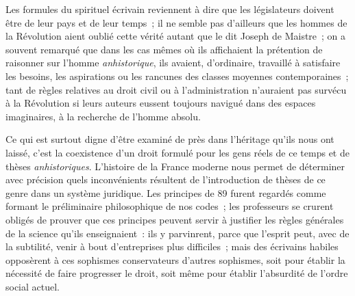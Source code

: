 \documentclass[french,twoside]{book} %
\begin{document}
Les formules du spirituel écrivain reviennent à dire que les législateurs doivent être de leur pays et de leur  temps ; il ne semble pas d’ailleurs que les hommes de la Révolution aient oublié cette vérité autant que le dit Joseph de Maistre ; on a souvent remarqué que dans les cas mêmes où ils affichaient la prétention de raisonner sur l’homme \emph{anhistorique}, ils avaient, d’ordinaire, travaillé à satisfaire les besoins, les aspirations ou les rancunes des classes moyennes contemporaines ; tant de règles relatives au droit civil ou à l’administration n’auraient pas survécu à la Révolution si leurs auteurs eussent toujours navigué dans des espaces imaginaires, à la recherche de l’homme absolu.\par
Ce qui est surtout digne d’être examiné de près dans l’héritage qu’ils nous ont laissé, c’est la coexistence d’un droit formulé pour les gens réels de ce temps et de thèses \emph{anhistoriques}. L’histoire de la France moderne nous permet de déterminer avec précision quels inconvénients résultent de l’introduction de thèses de ce genre dans un système juridique. Les principes de 89 furent regardés comme formant le préliminaire philosophique de nos codes ; les professeurs se crurent obligés de prouver que ces principes peuvent servir à justifier les règles générales de la science qu’ils enseignaient : ils y parvinrent, parce que l’esprit peut, avec de la subtilité, venir à bout d’entreprises plus difficiles ; mais des écrivains habiles opposèrent à ces sophismes conservateurs d’autres sophismes, soit pour établir la nécessité de faire progresser le droit, soit même pour établir l’absurdité de l’ordre social actuel.\par
\end{document}
